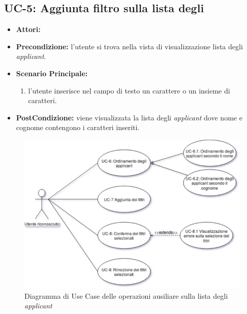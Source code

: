\subsection{UC-5: Aggiunta filtro sulla lista degli\applicant}
\begin{itemize}
	\item \textbf{Attori:}\loggedusr
	\item \textbf{Precondizione:} l'utente si trova nella vista di visualizzazione lista degli \textit{applicant}.
	\item \textbf{Scenario Principale:}
	\begin{enumerate}
		\item l'utente inserisce nel campo di testo un carattere o un insieme di caratteri.
	\end{enumerate}
	\item \textbf{PostCondizione:} viene visualizzata la lista degli \textit{applicant} dove nome e cognome contengono i caratteri inseriti.
\end{itemize}


\vspace{0.5em}
\begin{figure}[!h]
	\centering 
	\includegraphics[width=1\columnwidth]{immagini/usecase/UC2} 
	\caption{Diagramma di Use Case delle operazioni ausiliare sulla lista degli \textit{applicant}}
	\label{figura:uc-2}
\end{figure}

